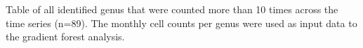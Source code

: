 \documentclass[]{agujournal2019}
\begin{document}




%
\begin{table}
\caption{Table of all identified genus that were counted more than 10 times across the time series (n=89). The monthly cell counts per genus were used as input data to the gradient forest analysis.}


\end{table}
\end{document}
